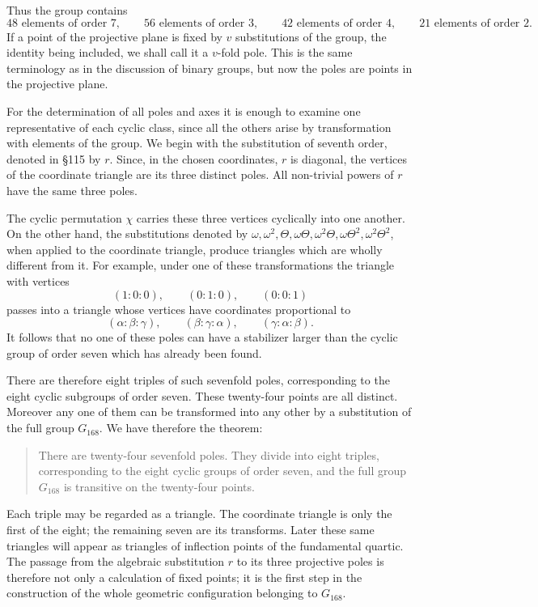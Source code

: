 \documentclass[11pt,a4paper]{book}
\begin{document}
Thus the group contains
\[
48\text{ elements of order }7,
\qquad 56\text{ elements of order }3,
\qquad 42\text{ elements of order }4,
\qquad 21\text{ elements of order }2.
\]
If a point of the projective plane is fixed by \(v\) substitutions of the group, the identity being included, we shall call it a \(v\)-fold pole.  This is the same terminology as in the discussion of binary groups, but now the poles are points in the projective plane.

For the determination of all poles and axes it is enough to examine one representative of each cyclic class, since all the others arise by transformation with elements of the group.  We begin with the substitution of seventh order, denoted in \S 115 by \(r\).  Since, in the chosen coordinates, \(r\) is diagonal, the vertices of the coordinate triangle are its three distinct poles.  All non-trivial powers of \(r\) have the same three poles.

The cyclic permutation \(\chi\) carries these three vertices cyclically into one another.  On the other hand, the substitutions denoted by \(\omega,\omega^2,\Theta,\omega\Theta,\omega^2\Theta,\omega\Theta^2,\omega^2\Theta^2\), when applied to the coordinate triangle, produce triangles which are wholly different from it.  For example, under one of these transformations the triangle with vertices
\[
(1:0:0),\qquad (0:1:0),\qquad (0:0:1)
\]
passes into a triangle whose vertices have coordinates proportional to
\[
(\alpha:\beta:\gamma),\qquad (\beta:\gamma:\alpha),\qquad
(\gamma:\alpha:\beta).
\]
It follows that no one of these poles can have a stabilizer larger than the cyclic group of order seven which has already been found.

There are therefore eight triples of such sevenfold poles, corresponding to the eight cyclic subgroups of order seven.  These twenty-four points are all distinct.  Moreover any one of them can be transformed into any other by a substitution of the full group \(G_{168}\).  We have therefore the theorem:

\begin{quote}
There are twenty-four sevenfold poles.  They divide into eight triples, corresponding to the eight cyclic groups of order seven, and the full group \(G_{168}\) is transitive on the twenty-four points.
\end{quote}

Each triple may be regarded as a triangle.  The coordinate triangle is only the first of the eight; the remaining seven are its transforms.  Later these same triangles will appear as triangles of inflection points of the fundamental quartic.  The passage from the algebraic substitution \(r\) to its three projective poles is therefore not only a calculation of fixed points; it is the first step in the construction of the whole geometric configuration belonging to \(G_{168}\).
\end{document}
